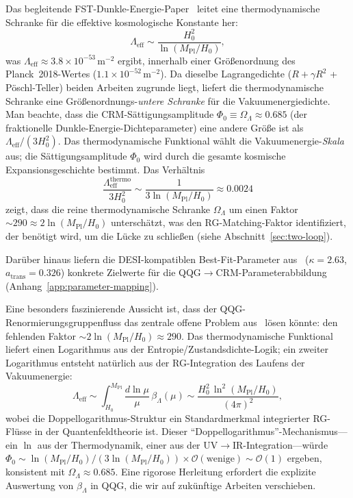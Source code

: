 \documentclass[aps,prd,twocolumn,superscriptaddress,nofootinbib]{revtex4-2}
\begin{document}
Das begleitende FST-Dunkle-Energie-Paper~\cite{GeigerDE2026} leitet eine thermodynamische Schranke für die effektive kosmologische Konstante her:
\begin{equation}
\Lambda_\mathrm{eff} \sim \frac{H_0^2}{\ln(M_\mathrm{Pl}/H_0)},
\label{eq:lambda-bound}
\end{equation}
was $\Lambda_\mathrm{eff} \approx 3.8 \times 10^{-53}\,\mathrm{m}^{-2}$ ergibt, innerhalb einer Größenordnung des Planck~2018-Wertes ($1.1 \times 10^{-52}\,\mathrm{m}^{-2}$). Da dieselbe Lagrangedichte ($R + \gamma R^2$ + Pöschl-Teller) beiden Arbeiten zugrunde liegt, liefert die thermodynamische Schranke eine Größenordnungs-\textit{untere Schranke} für die Vakuumenergiedichte. Man beachte, dass die CRM-Sättigungsamplitude $\Phi_0 \equiv \Omega_\Lambda \approx 0.685$ (der fraktionelle Dunkle-Energie-Dichteparameter) eine andere Größe ist als $\Lambda_\mathrm{eff}/(3H_0^2)$. Das thermodynamische Funktional wählt die Vakuumenergie-\textit{Skala} aus; die Sättigungsamplitude $\Phi_0$ wird durch die gesamte kosmische Expansionsgeschichte bestimmt. Das Verhältnis
\begin{equation}
\frac{\Lambda_\mathrm{eff}^\mathrm{thermo}}{3H_0^2} \sim \frac{1}{3\ln(M_\mathrm{Pl}/H_0)} \approx 0.0024
\end{equation}
zeigt, dass die reine thermodynamische Schranke $\Omega_\Lambda$ um einen Faktor $\sim 290 \approx 2\ln(M_\mathrm{Pl}/H_0)$ unterschätzt, was den RG-Matching-Faktor identifiziert, der benötigt wird, um die Lücke zu schließen (siehe Abschnitt~\ref{sec:two-loop}).

Darüber hinaus liefern die DESI-kompatiblen Best-Fit-Parameter aus~\cite{GeigerDE2026} ($\kappa = 2.63$, $a_\mathrm{trans} = 0.326$) konkrete Zielwerte für die QQG$\to$CRM-Parameterabbildung (Anhang~\ref{app:parameter-mapping}).

Eine besonders faszinierende Aussicht ist, dass der QQG-Renormierungsgruppenfluss das zentrale offene Problem aus~\cite{GeigerDE2026} lösen könnte: den fehlenden Faktor $\sim 2\ln(M_\mathrm{Pl}/H_0) \approx 290$. Das thermodynamische Funktional liefert einen Logarithmus aus der Entropie/Zustandsdichte-Logik; ein zweiter Logarithmus entsteht natürlich aus der RG-Integration des Laufens der Vakuumenergie:
\begin{equation}
\Lambda_\mathrm{eff} \sim \int_{H_0}^{M_\mathrm{Pl}} \frac{d\ln\mu}{\mu}\,\beta_\Lambda(\mu) \sim \frac{H_0^2\,\ln^2(M_\mathrm{Pl}/H_0)}{(4\pi)^2},
\end{equation}
wobei die Doppellogarithmus-Struktur ein Standardmerkmal integrierter RG-Flüsse in der Quantenfeldtheorie ist. Dieser ``Doppellogarithmus''-Mechanismus---ein $\ln$ aus der Thermodynamik, einer aus der UV$\to$IR-Integration---würde $\Phi_0 \sim \ln(M_\mathrm{Pl}/H_0)/(3\ln(M_\mathrm{Pl}/H_0)) \times \mathcal{O}(\text{wenige}) \sim \mathcal{O}(1)$ ergeben, konsistent mit $\Omega_\Lambda \approx 0.685$. Eine rigorose Herleitung erfordert die explizite Auswertung von $\beta_\Lambda$ in QQG, die wir auf zukünftige Arbeiten verschieben.
\end{document}
